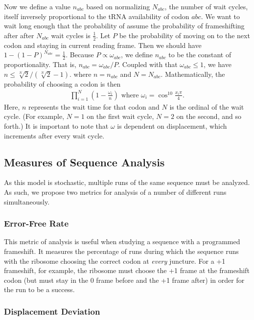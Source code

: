 \documentclass[12pt]{article}
\numberwithin{equation}{section}
\begin{document}
Now we define a value $n_{abc}$ based on normalizing $N_{abc}$, the
number of wait cycles, itself inversely proportional to the
tRNA availability of codon $abc$.
We want to wait long enough that the probability of assume the probability of frameshifting after
after $N_{abc}$ wait cycles is $\frac{1}{2}$.  Let $P$ be the
probability of moving on to the next codon and staying in current reading
frame.  Then we should have $1-\left(1-P\right)^{N_{abc}} =
\frac{1}{2}$.  Because $P \propto \omega_{abc}$, we define $n_{abc}$ to be the constant of
proportionality. That is, $n_{abc} = \omega_{abc} / P$.  Coupled
with that $\omega_{abc} \le 1$, we have $n \le \sqrt[N]{2}/(\sqrt[N]{2} - 1).$
where $n = n_{abc}$ and $N = N_{abc}$. Mathematically, the probability of choosing a codon is then
\begin{align}
  \prod_{i=1}^N \left(1-\frac{\omega_i}{n}\right) \text{ where } \omega_i = \cos^{10}{\frac{x_i\pi}{4}}.
\end{align}
Here, $n$ represents the wait time for that codon and $N$ is the ordinal of the wait cycle. (For example,
$N=1$ on the first wait cycle, $N=2$ on the second, and so forth.)
It is important to note that $\omega$ is dependent on displacement, 
which increments after every wait cycle.


\subsection{Measures of Sequence Analysis}

As this model is stochastic, multiple runs of the same sequence must be analyzed.
As such, we propose two metrics for analysis of a number of different runs 
simultaneously. 

\subsubsection{Error-Free Rate}

This metric of analysis is useful when studying a 
sequence with a programmed frameshift.  It measures the percentage of runs 
during which the sequence runs with the ribosome choosing the correct codon
at \emph{every} juncture.  For a +1 frameshift, for example, the ribosome must
choose the +1 frame at the frameshift codon (but must stay in the 0 frame before
and the +1 frame after) in order for the run to be a success.

\subsubsection{Displacement Deviation}
\end{document}
